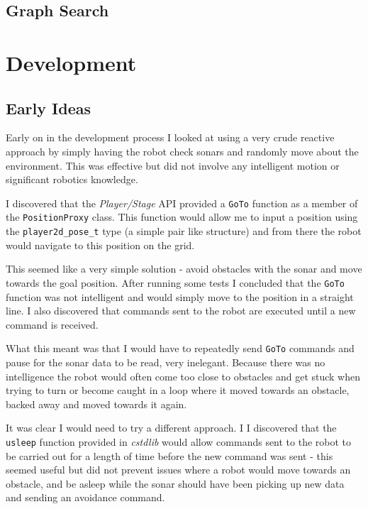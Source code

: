 \documentclass[a4paper,12pt]{article}
\begin{document}
\subsection{Graph Search}
\section{Development}
\subsection{Early Ideas}
Early on in the development process I looked at using a very crude reactive approach by simply having the robot check sonars and randomly move about the environment. This was effective but did not involve any intelligent motion or significant robotics knowledge. 

I discovered that the \textit{Player/Stage} API provided a \texttt{GoTo} function as a member of the \texttt{PositionProxy} class. This function would allow me to input a position using the \texttt{player2d\_pose\_t} type (a simple pair like structure) and from there the robot would navigate to this position on the grid.

This seemed like a very simple solution - avoid obstacles with the sonar and move towards the goal position. After running some tests I concluded that the \texttt{GoTo} function was not intelligent and would simply move to the position in a straight line. I also discovered that commands sent to the robot are executed until a new command is received.

What this meant was that I would have to repeatedly send \texttt{GoTo} commands and pause for the sonar data to be read, very inelegant. Because there was no intelligence the robot would often come too close to obstacles and get stuck when trying to turn or become caught in a loop where it moved towards an obstacle, backed away and moved towards it again.

It was clear I would need to try a different approach. I I discovered that the \texttt{usleep} function provided in \textit{cstdlib} would allow commands sent to the robot to be carried out for a length of time before the new command was sent - this seemed useful but did not prevent issues where a robot would move towards an obstacle, and be asleep while the sonar should have been picking up new data and sending an avoidance command.
\end{document}
